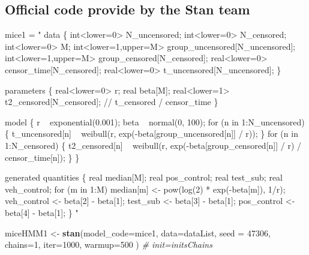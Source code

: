 \documentclass[]{article}
\newenvironment{Shaded}{\begin{snugshade}}{\end{snugshade}}
\newcommand{\KeywordTok}[1]{\textcolor[rgb]{0.13,0.29,0.53}{\textbf{#1}}}
\newcommand{\DataTypeTok}[1]{\textcolor[rgb]{0.13,0.29,0.53}{#1}}
\newcommand{\DecValTok}[1]{\textcolor[rgb]{0.00,0.00,0.81}{#1}}
\newcommand{\StringTok}[1]{\textcolor[rgb]{0.31,0.60,0.02}{#1}}
\newcommand{\CommentTok}[1]{\textcolor[rgb]{0.56,0.35,0.01}{\textit{#1}}}
\newcommand{\NormalTok}[1]{#1}
\begin{document}
\subsection{Official code provide by the Stan
team}\label{official-code-provide-by-the-stan-team}

\begin{Shaded}
\begin{Highlighting}[]
\NormalTok{mice1 =}\StringTok{ "}
\StringTok{data \{}
\StringTok{  int<lower=0> N_uncensored;}
\StringTok{  int<lower=0> N_censored;}
\StringTok{  int<lower=0> M;}
\StringTok{  int<lower=1,upper=M> group_uncensored[N_uncensored];}
\StringTok{  int<lower=1,upper=M> group_censored[N_censored];}
\StringTok{  real<lower=0> censor_time[N_censored];}
\StringTok{  real<lower=0> t_uncensored[N_uncensored];}
\StringTok{\}}

\StringTok{parameters \{}
\StringTok{  real<lower=0> r;}
\StringTok{  real beta[M];}
\StringTok{  real<lower=1> t2_censored[N_censored]; // t_censored / censor_time }
\StringTok{\}}

\StringTok{model \{}
\StringTok{  r ~ exponential(0.001);}
\StringTok{  beta ~ normal(0, 100);}
\StringTok{  for (n in 1:N_uncensored) \{}
\StringTok{    t_uncensored[n] ~ weibull(r, exp(-beta[group_uncensored[n]] / r));}
\StringTok{  \}}
\StringTok{  for (n in 1:N_censored) \{}
\StringTok{    t2_censored[n] ~ weibull(r, exp(-beta[group_censored[n]] / r) / censor_time[n]);}
\StringTok{  \}}
\StringTok{\}}

\StringTok{generated quantities \{}
\StringTok{  real median[M];}
\StringTok{  real pos_control;}
\StringTok{  real test_sub;}
\StringTok{  real veh_control;}
\StringTok{  }
\StringTok{  for (m in 1:M)}
\StringTok{    median[m] <- pow(log(2) * exp(-beta[m]), 1/r);}
\StringTok{  }
\StringTok{  veh_control <- beta[2] - beta[1];}
\StringTok{  test_sub    <- beta[3] - beta[1];}
\StringTok{  pos_control <- beta[4] - beta[1];}
\StringTok{\}}
\StringTok{"} 

\NormalTok{miceHMM1 <-}\StringTok{ }\KeywordTok{stan}\NormalTok{(}\DataTypeTok{model_code=}\NormalTok{mice1, }\DataTypeTok{data=}\NormalTok{dataList, }\DataTypeTok{seed =} \DecValTok{47306}\NormalTok{, }\DataTypeTok{chains=}\DecValTok{1}\NormalTok{,  }
                    \DataTypeTok{iter=}\DecValTok{1000}\NormalTok{, }
                    \DataTypeTok{warmup=}\DecValTok{500}\NormalTok{ ) }\CommentTok{# init=initsChains}
\end{Highlighting}
\end{Shaded}
\end{document}
